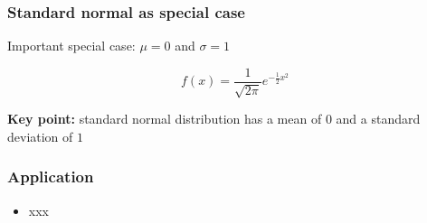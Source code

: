 \documentclass[english,14pt]{beamer}
\begin{document}

\begin{frame}[fragile]

\frametitle{Standard normal as special case}

Important special case: $\mu=0$ and $\sigma=1$

\[
f(x) = \frac{1}{\sqrt{2\pi}} e^{-\frac{1}{2}x^2}
\]

\textbf{Key point:} standard normal distribution has a mean of $0$ and a standard deviation of $1$

\end{frame}


\begin{frame}[fragile]

\frametitle{Application}

\begin{itemize}
	\item xxx
\end{itemize}

\end{frame}

%
%
%
%
%

\end{document}
